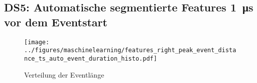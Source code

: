 \subsection{DS5: Automatische segmentierte Features \SI{1}{\micro\second} vor dem Eventstart}






\begin{figure}[H]
    \centering
      \texttt{[image: ../figures/maschinelearning/features\_right\_peak\_event\_distance\_ts\_auto\_event\_duration\_histo.pdf]}
      \caption{Verteilung der Eventlänge}
      \label{fig:1mus-event-duration-box}
\end{figure}







